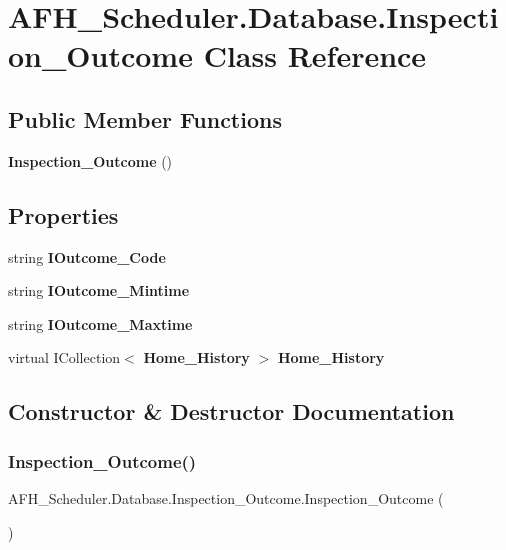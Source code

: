 \section{A\+F\+H\+\_\+\+Scheduler.\+Database.\+Inspection\+\_\+\+Outcome Class Reference}
\label{class_a_f_h___scheduler_1_1_database_1_1_inspection___outcome}
\subsection*{Public Member Functions}
\begin{DoxyCompactItemize}
\item 
\textbf{ Inspection\+\_\+\+Outcome} ()
\end{DoxyCompactItemize}
\subsection*{Properties}
\begin{DoxyCompactItemize}
\item 
string \textbf{ I\+Outcome\+\_\+\+Code}\hspace{0.3cm}{\ttfamily  [get, set]}
\item 
string \textbf{ I\+Outcome\+\_\+\+Mintime}\hspace{0.3cm}{\ttfamily  [get, set]}
\item 
string \textbf{ I\+Outcome\+\_\+\+Maxtime}\hspace{0.3cm}{\ttfamily  [get, set]}
\item 
virtual I\+Collection$<$ \textbf{ Home\+\_\+\+History} $>$ \textbf{ Home\+\_\+\+History}\hspace{0.3cm}{\ttfamily  [get, set]}
\end{DoxyCompactItemize}


\subsection{Constructor \& Destructor Documentation}
\mbox{\label{class_a_f_h___scheduler_1_1_database_1_1_inspection___outcome_a1272641da24b7b609acf026ec0b5608e}} 
\subsubsection{Inspection\_Outcome()}
{\footnotesize\ttfamily A\+F\+H\+\_\+\+Scheduler.\+Database.\+Inspection\+\_\+\+Outcome.\+Inspection\+\_\+\+Outcome (\begin{DoxyParamCaption}{ }\end{DoxyParamCaption})}



